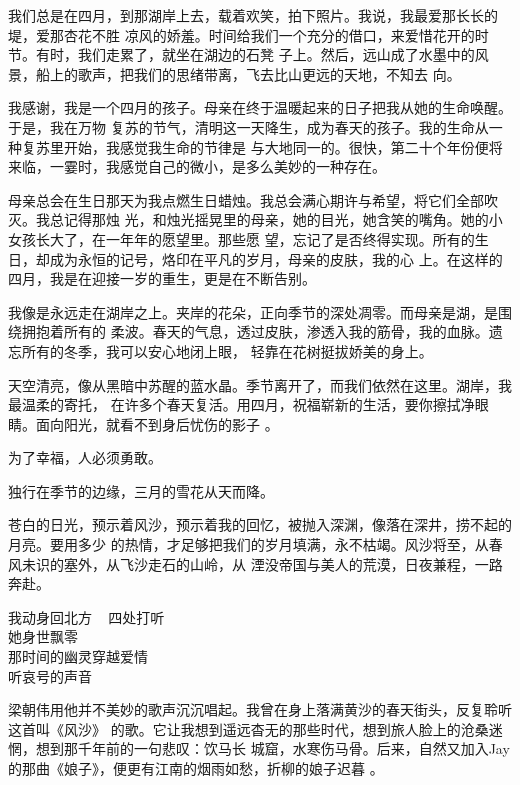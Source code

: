 \documentclass[12pt,a4paper]{article}
\begin{document}
		我们总是在四月，到那湖岸上去，载着欢笑，拍下照片。我说，我最爱那长长的堤，爱那杏花不胜
	凉风的娇羞。时间给我们一个充分的借口，来爱惜花开的时节。有时，我们走累了，就坐在湖边的石凳
	子上。然后，远山成了水墨中的风景，船上的歌声，把我们的思绪带离，飞去比山更远的天地，不知去
	向。

		我感谢，我是一个四月的孩子。母亲在终于温暖起来的日子把我从她的生命唤醒。于是，我在万物
	复苏的节气，清明这一天降生，成为春天的孩子。我的生命从一种复苏里开始，我感觉我生命的节律是
	与大地同一的。很快，第二十个年份便将来临，一霎时，我感觉自己的微小，是多么美妙的一种存在。

		母亲总会在生日那天为我点燃生日蜡烛。我总会满心期许与希望，将它们全部吹灭。我总记得那烛
	光，和烛光摇晃里的母亲，她的目光，她含笑的嘴角。她的小女孩长大了，在一年年的愿望里。那些愿
	望，忘记了是否终得实现。所有的生日，却成为永恒的记号，烙印在平凡的岁月，母亲的皮肤，我的心
	上。在这样的四月，我是在迎接一岁的重生，更是在不断告别。

		我像是永远走在湖岸之上。夹岸的花朵，正向季节的深处凋零。而母亲是湖，是围绕拥抱着所有的
	柔波。春天的气息，透过皮肤，渗透入我的筋骨，我的血脉。遗忘所有的冬季，我可以安心地闭上眼，
	轻靠在花树挺拔娇美的身上。

		天空清亮，像从黑暗中苏醒的蓝水晶。季节离开了，而我们依然在这里。湖岸，我最温柔的寄托，
	在许多个春天复活。用四月，祝福崭新的生活，要你擦拭净眼睛。面向阳光，就看不到身后忧伤的影子
	。

		为了幸福，人必须勇敢。

	\endwriting



		独行在季节的边缘，三月的雪花从天而降。

		苍白的日光，预示着风沙，预示着我的回忆，被抛入深渊，像落在深井，捞不起的月亮。要用多少
	的热情，才足够把我们的岁月填满，永不枯竭。风沙将至，从春风未识的塞外，从飞沙走石的山岭，从
	湮没帝国与美人的荒漠，日夜兼程，一路奔赴。

		\longpoem{}{}{}
		我动身回北方 ~ 四处打听 \\
		她身世飘零 \\
		那时间的幽灵穿越爱情 \\
		听哀号的声音
		\endlongpoem

		梁朝伟用他并不美妙的歌声沉沉唱起。我曾在身上落满黄沙的春天街头，反复聆听这首叫《风沙》
	的歌。它让我想到遥远杳无的那些时代，想到旅人脸上的沧桑迷惘，想到那千年前的一句悲叹：饮马长
	城窟，水寒伤马骨。后来，自然又加入Jay的那曲《娘子》，便更有江南的烟雨如愁，折柳的娘子迟暮
	。
\end{document}
